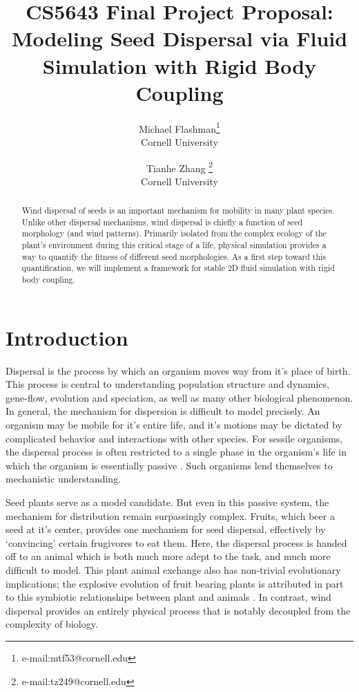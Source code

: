 \documentclass[annual]{acmsiggraph}
\title{CS5643 Final Project Proposal: \\ Modeling Seed Dispersal via Fluid Simulation with Rigid Body Coupling}
\author{Michael Flashman\thanks{e-mail:mtf53@cornell.edu}\\Cornell University \and Tianhe Zhang \thanks{e-mail:tz249@cornell.edu}\\Cornell University}
\begin{document}
\maketitle

\begin{abstract}
Wind dispersal of  seeds is an important mechanism for mobility in many plant species.  Unlike other dispersal mechanisms, wind dispersal is chiefly a function of seed morphology (and wind patterns).  Primarily isolated from the  complex ecology of the plant's environment during this critical stage of a life, physical simulation provides a way to  quantify the fitness of different seed morphologies.   As a first step toward this quantification, we will implement a  framework for stable 2D fluid simulation with rigid body coupling.
\end{abstract}

\keywordlist

\copyrightspace

\section{Introduction}


Dispersal is the process by which an organism moves way from it's place of birth.  This process is central to understanding  population structure and dynamics, gene-flow, evolution and speciation, as well as many other biological phenomenon\cite{levin1989}.   In general, the mechanism for dispersion is difficult to model precisely. An organism may be mobile for it's entire life, and it's motions may be dictated by complicated behavior and interactions with other species.  For sessile organisms, the dispersal process is often restricted to a single phase in the organism's life in which the organism is essentially passive \cite{nathan2000}.   Such organisms lend themselves to mechanistic understanding.  

Seed plants serve as a model candidate. But even in this passive system, the mechanism for distribution remain surpassingly complex.  Fruits, which beer a seed at it's center, provides one mechanism for seed dispersal, effectively by `convincing' certain frugivores  to eat them. Here, the dispersal process is handed off to an animal which is both much more adept to the task, and much more difficult to model. This plant animal exchange also has non-trivial evolutionary implications; the explosive evolution of fruit bearing plants is  attributed in part to this symbiotic relationships between plant and animals \cite{lorts2008}.  In contrast, wind dispersal provides an entirely physical process that is notably decoupled from the complexity of biology.   
\end{document}
